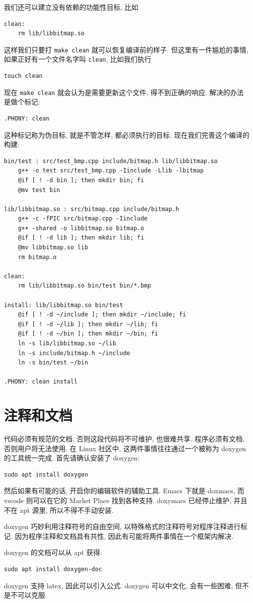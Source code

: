 \documentclass[a4paper]{ctexart}
\begin{document}
我们还可以建立没有依赖的功能性目标, 比如
\begin{verbatim}
clean:
	rm lib/libbitmap.so
\end{verbatim}
这样我们只要打 \verb|make clean| 就可以恢复编译前的样子.
但这里有一件尴尬的事情, 如果正好有一个文件名字叫 \verb|clean|, 比如我们执行
\begin{verbatim}
touch clean
\end{verbatim}
现在 \verb|make clean| 就会认为是需要更新这个文件, 得不到正确的响应. 解决的办法是做个标记:
\begin{verbatim}
.PHONY: clean
\end{verbatim}
这种标记称为伪目标, 就是不管怎样, 都必须执行的目标. 现在我们完善这个编译的构建:
\begin{verbatim}
bin/test : src/test_bmp.cpp include/bitmap.h lib/libbitmap.so
	g++ -o test src/test_bmp.cpp -Iinclude -Llib -lbitmap 
	@if [ ! -d bin ]; then mkdir bin; fi
	@mv test bin

lib/libbitmap.so : src/bitmap.cpp include/bitmap.h 
	g++ -c -fPIC src/bitmap.cpp -Iinclude 
	g++ -shared -o libbitmap.so bitmap.o
	@if [ ! -d lib ]; then mkdir lib; fi
	@mv libbitmap.so lib
	rm bitmap.o

clean:
	rm lib/libbitmap.so bin/test bin/*.bmp

install: lib/libbitmap.so bin/test
	@if [ ! -d ~/include ]; then mkdir ~/include; fi
	@if [ ! -d ~/lib ]; then mkdir ~/lib; fi
	@if [ ! -d ~/bin ]; then mkdir ~/bin; fi
	ln -s lib/libbitmap.so ~/lib
	ln -s include/bitmap.h ~/include
	ln -s bin/test ~/bin

.PHONY: clean install
\end{verbatim}

\section{注释和文档}

代码必须有规范的文档. 否则这段代码将不可维护, 也很难共享. 程序必须有文档, 否则用户将无法使用.
在 Linux 社区中, 这两件事情往往通过一个被称为 doxygen 的工具统一完成.
首先请确认安装了 doxygen:
\begin{verbatim}
sudo apt install doxygen
\end{verbatim}
然后如果有可能的话, 开启你的编辑软件的辅助工具. Emacs 下就是 doxmacs, 而 vscode 则可以在它的
Market Place 找到各种支持. doxymacs 已经停止维护, 并且不在 apt 源里, 所以不得不手动安装.

doxygen 巧妙利用注释符号的自由空间, 以特殊格式的注释符号对程序注释进行标记. 因为程序注释和文档具有共性,
因此有可能将两件事情在一个框架内解决.

doxygen 的文档可以从 apt 获得:
\begin{verbatim}
sudo apt install doxygen-doc
\end{verbatim}

doxygen 支持 latex, 因此可以引入公式. doxygen 可以中文化, 会有一些困难, 但不是不可以克服.





\end{document}
